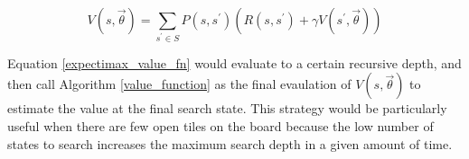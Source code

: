 \documentclass{article}
\begin{document}
\begin{equation}
\label{expectimax_value_fn}
V(s, \vec{\theta}) = \sum_{s^\prime \in S} P(s, s^\prime)(R(s, s^\prime) + \gamma V(s^\prime, \vec{\theta}))
\end{equation}

Equation \ref{expectimax_value_fn} would evaluate to a certain recursive depth, and then call Algorithm \ref{value_function} as the final evaulation of $V(s, \vec{\theta})$ to estimate the value at the final search state.  This strategy would be particularly useful when there are few open tiles on the board because the low number of states to search increases the maximum search depth in a given amount of time.





\end{document}
